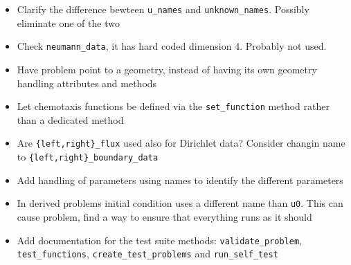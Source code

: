 \begin{todobox}
	\begin{itemize}[leftmargin=1.5em]
		\item Clarify the difference bewteen {\tt u\_names} and {\tt unknown\_names}. Possibly eliminate one of the two
		\item Check {\tt neumann\_data}, it has hard coded dimension 4. Probably not used.
		\item  Have problem point to a geometry, instead of having its own geometry handling attributes and methods
		\item Let chemotaxis functions be defined via the {\tt set\_function} method rather than a dedicated method
		\item Are {\tt \{left,right\}\_flux} used also for Dirichlet data? Consider changin name to {\tt \{left,right\}\_boundary\_data}
		\item Add handling of parameters using names to identify the different parameters
		\item In derived problems initial condition uses a different name than {\tt u0}. This can cause problem, find a way to ensure that everything runs as it should
		\item Add documentation for the test suite methods: {\tt validate\_problem}, {\tt test\_functions}, {\tt create\_test\_problems} and {\tt run\_self\_test}
	\end{itemize}
\end{todobox}


